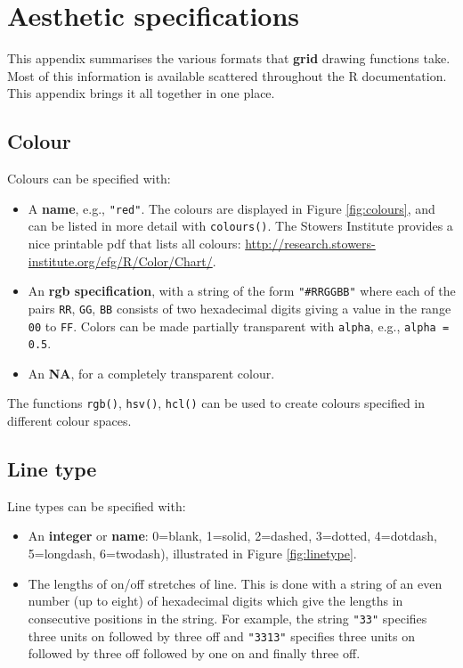 \chapter{Aesthetic specifications}\label{cha:specifications}

This appendix summarises the various formats that \textbf{grid} drawing
functions take. Most of this information is available scattered
throughout the R documentation. This appendix brings it all together in
one place. 

\section{Colour}\label{sec:colourux5fspec}

Colours can be specified with: 

\begin{itemize}
\itemsep1pt\parskip0pt
\item
  A \textbf{name}, e.g., \texttt{"red"}. The colours are displayed in
  Figure \ref{fig:colours}, and can be listed in more detail with
  \texttt{colours()}. The Stowers Institute provides a nice printable
  pdf that lists all colours:
  \url{http://research.stowers-institute.org/efg/R/Color/Chart/}.
\item
  An \textbf{rgb specification}, with a string of the form
  \texttt{"\#RRGGBB"} where each of the pairs \texttt{RR}, \texttt{GG},
  \texttt{BB} consists of two hexadecimal digits giving a value in the
  range \texttt{00} to \texttt{FF}. Colors can be made partially
  transparent with \texttt{alpha}, e.g., \texttt{alpha = 0.5}.
\item
  An \textbf{NA}, for a completely transparent colour.
\end{itemize}

The functions \texttt{rgb()}, \texttt{hsv()}, \texttt{hcl()} can be used
to create colours specified in different colour spaces.

\section{Line type}\label{sec:line-type-spec}

Line types can be specified with: 

\begin{itemize}
\itemsep1pt\parskip0pt
\item
  An \textbf{integer} or \textbf{name}: 0=blank, 1=solid, 2=dashed,
  3=dotted, 4=dotdash, 5=longdash, 6=twodash), illustrated in Figure
  \ref{fig:linetype}.
\item
  The lengths of on/off stretches of line. This is done with a string of
  an even number (up to eight) of hexadecimal digits which give the
  lengths in consecutive positions in the string. For example, the
  string \texttt{"33"} specifies three units on followed by three off
  and \texttt{"3313"} specifies three units on followed by three off
  followed by one on and finally three off.
\end{itemize}

